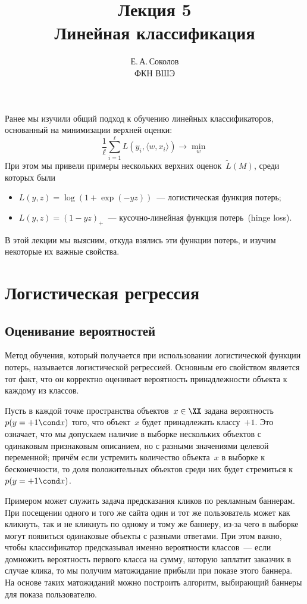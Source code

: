 \documentclass[12pt,fleqn]{article}
\begin{document}
\title{Лекция 5\\Линейная классификация}
\author{Е.\,А.\,Соколов\\ФКН ВШЭ}
\maketitle

Ранее мы изучили общий подход к обучению линейных классификаторов, основанный на минимизации
верхней оценки:
\[
    \frac{1}{\ell}
    \sum_{i = 1}^{\ell}
        L(y_i, \langle w, x_i \rangle)
    \to
    \min_{w}
\]
При этом мы привели примеры нескольких верхних оценок~$\tilde L(M)$,
среди которых были
\begin{itemize}
    \item $L(y, z) = \log(1 + \exp(-yz))$~--- логистическая функция потерь;
    \item $L(y, z) = (1 - yz)_+$~--- кусочно-линейная функция потерь~(hinge loss).
\end{itemize}
В этой лекции мы выясним, откуда взялись эти функции потерь, и изучим некоторые их важные свойства.

\section{Логистическая регрессия}
\subsection{Оценивание вероятностей}
Метод обучения, который получается при использовании логистической функции потерь,
называется логистической регрессией.
Основным его свойством является тот факт, что он корректно оценивает вероятность
принадлежности объекта к каждому из классов.

Пусть в каждой точке пространства объектов~$x \in \XX$ задана вероятность~$p(y = +1 \cond x)$
того, что объект~$x$ будет принадлежать классу~$+1$.
Это означает, что мы допускаем наличие в выборке нескольких объектов
с одинаковым признаковым описанием, но с разными значениями целевой переменной;
причём если устремить количество объекта~$x$ в выборке к бесконечности,
то доля положительных объектов среди них будет стремиться к~$p(y = +1 \cond x)$.

Примером может служить задача предсказания кликов по рекламным баннерам.
При посещении одного и того же сайта один и тот же пользователь может как кликнуть,
так и не кликнуть по одному и тому же баннеру,
из-за чего в выборке могут появиться одинаковые объекты с разными ответами.
При этом важно, чтобы классификатор предсказывал именно вероятности классов~---
если домножить вероятность первого класса на сумму, которую заплатит заказчик в случае клика,
то мы получим матожидание прибыли при показе этого баннера.
На основе таких матожиданий можно построить алгоритм, выбирающий
баннеры для показа пользователю.
\end{document}
